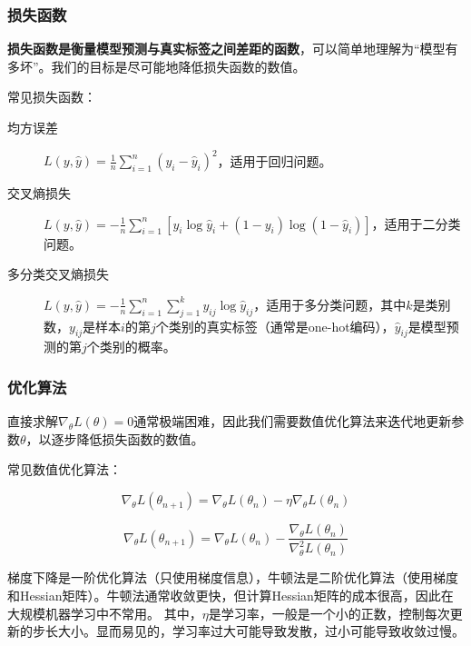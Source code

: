 \documentclass[aspectratio=1610]{ctexbeamer}
\begin{document}
\begin{frame}
    \frametitle{损失函数}

    \textbf{损失函数是衡量模型预测与真实标签之间差距的函数}，可以简单地理解为“模型有多坏”。我们的目标是尽可能地降低损失函数的数值。

    \vspace{1em}

    常见损失函数：
    \begin{description}
        \item[均方误差] $L(y, \hat{y}) = \frac{1}{n} \sum_{i=1}^n (y_i - \hat{y}_i)^2$，适用于回归问题。
        \item[交叉熵损失] $L(y, \hat{y}) = -\frac{1}{n} \sum_{i=1}^n [y_i \log \hat{y}_i + (1 - y_i) \log (1 - \hat{y}_i)]$，适用于二分类问题。
        \item[多分类交叉熵损失] $L(y, \hat{y}) = -\frac{1}{n} \sum_{i=1}^n \sum_{j=1}^k y_{ij} \log \hat{y}_{ij}$，适用于多分类问题，其中$k$是类别数，$y_{ij}$是样本$i$的第$j$个类别的真实标签（通常是one-hot编码），$\hat{y}_{ij}$是模型预测的第$j$个类别的概率。
    \end{description}

\end{frame}

\begin{frame}
    \frametitle{优化算法}

    直接求解$\nabla_\theta L(\theta) = 0$通常极端困难，因此我们需要数值优化算法来迭代地更新参数$\theta$，以逐步降低损失函数的数值。

    常见数值优化算法：

    \begin{equation}
\nabla_\theta L(\theta_{n+1}) = \nabla_\theta L(\theta_n) - \eta \nabla_\theta L(\theta_n) \tag{梯度下降}
    \end{equation}

    \begin{equation}
\nabla_\theta L(\theta_{n+1}) = \nabla_\theta L(\theta_n) - \frac{\nabla_\theta L(\theta_n)}{\nabla^2_\theta L(\theta_n)} \tag{牛顿法}
    \end{equation}

    梯度下降是一阶优化算法（只使用梯度信息），牛顿法是二阶优化算法（使用梯度和Hessian矩阵）。牛顿法通常收敛更快，但计算Hessian矩阵的成本很高，因此在大规模机器学习中不常用。
    其中，$\eta$是学习率，一般是一个小的正数，控制每次更新的步长大小。显而易见的，学习率过大可能导致发散，过小可能导致收敛过慢。

\end{frame}
\end{document}
